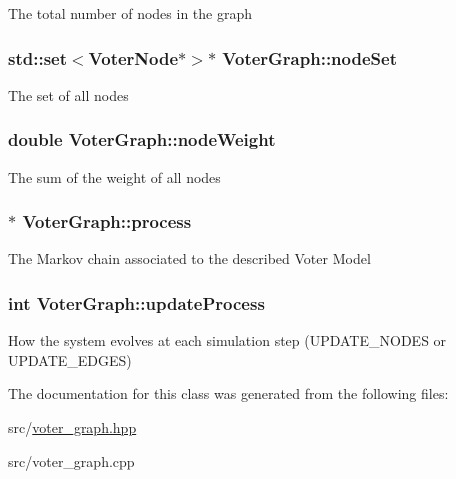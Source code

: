 The total number of nodes in the graph \hypertarget{classVoterGraph_ab4c1bdbd12ebccd735841471984dfeec}{
\subsubsection[{node\-Set}]{\setlength{\rightskip}{0pt plus 5cm}std\-::set$<${\bf Voter\-Node}$\ast$$>$$\ast$ Voter\-Graph\-::node\-Set}}\label{classVoterGraph_ab4c1bdbd12ebccd735841471984dfeec}
The set of all nodes \hypertarget{classVoterGraph_a8108f0b182d1ca41ef567f7b729fe749}{
\subsubsection[{node\-Weight}]{\setlength{\rightskip}{0pt plus 5cm}double Voter\-Graph\-::node\-Weight}}\label{classVoterGraph_a8108f0b182d1ca41ef567f7b729fe749}
The sum of the weight of all nodes \hypertarget{classVoterGraph_a94b668c67f423d3a4ce25d5605a467cb}{
\subsubsection[{process}]{$\ast$ Voter\-Graph\-::process}}\label{classVoterGraph_a94b668c67f423d3a4ce25d5605a467cb}
The Markov chain associated to the described Voter Model \hypertarget{classVoterGraph_a11db0ef474064d44adb3ea22df8199ee}{
\subsubsection[{update\-Process}]{\setlength{\rightskip}{0pt plus 5cm}int Voter\-Graph\-::update\-Process}}\label{classVoterGraph_a11db0ef474064d44adb3ea22df8199ee}
How the system evolves at each simulation step (U\-P\-D\-A\-T\-E\-\_\-\-N\-O\-D\-E\-S or U\-P\-D\-A\-T\-E\-\_\-\-E\-D\-G\-E\-S) 

The documentation for this class was generated from the following files\-:\begin{DoxyCompactItemize}
\item 
src/\hyperlink{voter__graph_8hpp}{voter\-\_\-graph.\-hpp}\item 
src/voter\-\_\-graph.\-cpp\end{DoxyCompactItemize}
